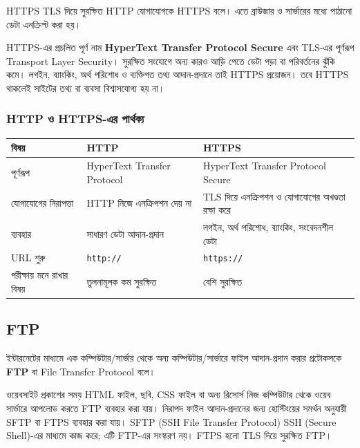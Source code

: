 \begin{definitionbox}{HTTPS}
TLS দিয়ে সুরক্ষিত HTTP যোগাযোগকে HTTPS বলে। এতে ব্রাউজার ও সার্ভারের মধ্যে পাঠানো ডেটা এনক্রিপ্ট করা হয়।
\end{definitionbox}

HTTPS-এর প্রচলিত পূর্ণ নাম \textbf{HyperText Transfer Protocol Secure} এবং TLS-এর পূর্ণরূপ Transport Layer Security। সুরক্ষিত সংযোগে অন্য কারও আড়ি পেতে ডেটা পড়া বা পরিবর্তনের ঝুঁকি কমে। লগইন, ব্যাংকিং, অর্থ পরিশোধ ও ব্যক্তিগত তথ্য আদান-প্রদানে তাই HTTPS প্রয়োজন। তবে HTTPS থাকলেই সাইটের তথ্য বা ব্যবসা বিশ্বাসযোগ্য হয় না।

\subsubsection{HTTP ও HTTPS-এর পার্থক্য}

\begin{center}
\begin{tabular}{|p{}|p{}|p{}|}
\hline
\textbf{বিষয়} & \textbf{HTTP} & \textbf{HTTPS} \\
\hline
পূর্ণরূপ & HyperText Transfer Protocol & HyperText Transfer Protocol Secure \\
\hline
যোগাযোগের নিরাপত্তা & HTTP নিজে এনক্রিপশন দেয় না & TLS দিয়ে এনক্রিপশন ও যোগাযোগের অখণ্ডতা রক্ষা করে \\
\hline
ব্যবহার & সাধারণ ডেটা আদান-প্রদান & লগইন, অর্থ পরিশোধ, ব্যাংকিং, সংবেদনশীল ডেটা \\
\hline
URL শুরু & \texttt{http://} & \texttt{https://} \\
\hline
পরীক্ষায় মনে রাখার বিষয় & তুলনামূলক কম সুরক্ষিত & বেশি সুরক্ষিত \\
\hline
\end{tabular}
\end{center}



\subsection{FTP}

\begin{definitionbox}{}
ইন্টারনেটের মাধ্যমে এক কম্পিউটার/সার্ভার থেকে অন্য কম্পিউটার/সার্ভারে ফাইল আদান-প্রদান করার প্রটোকলকে \textbf{FTP} বা File Transfer Protocol বলে।
\end{definitionbox}

ওয়েবসাইট প্রকাশের সময় HTML ফাইল, ছবি, CSS ফাইল বা অন্য রিসোর্স নিজ কম্পিউটার থেকে ওয়েব সার্ভারে আপলোড করতে FTP ব্যবহার করা যায়। নিরাপদ ফাইল আদান-প্রদানের জন্য হোস্টিংয়ের সমর্থন অনুযায়ী SFTP বা FTPS ব্যবহার করা যায়। SFTP (SSH File Transfer Protocol) SSH (Secure Shell)-এর মাধ্যমে কাজ করে; এটি FTP-এর সংস্করণ নয়। FTPS হলো TLS দিয়ে সুরক্ষিত FTP।

